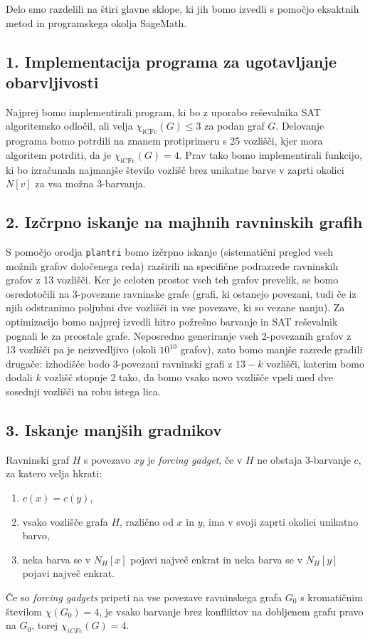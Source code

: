 \documentclass[11pt, a4paper]{article}
\begin{document}
Delo smo razdelili na štiri glavne sklope, ki jih bomo izvedli s pomočjo eksaktnih metod in programskega okolja SageMath.

\subsection*{1. Implementacija programa za ugotavljanje obarvljivosti}

Najprej bomo implementirali program, ki bo z uporabo reševalnika SAT algoritemsko odločil, ali velja $\chi_{\mathrm{iCFc}}(G) \le 3$ za podan graf $G$. Delovanje programa bomo potrdili na znanem protiprimeru s 25 vozlišči, kjer mora algoritem potrditi, da je $\chi_{\mathrm{iCFc}}(G) = 4$. Prav tako bomo implementirali funkcijo, ki bo izračunala najmanjše število vozlišč brez unikatne barve v zaprti okolici $N[v]$ za vsa možna 3-barvanja.

\subsection*{2. Izčrpno iskanje na majhnih ravninskih grafih}

S pomočjo orodja \texttt{plantri} bomo izčrpno iskanje (sistematični pregled vseh možnih grafov določenega reda) razširili na specifične podrazrede ravninskih grafov z 13 vozlišči. Ker je celoten prostor vseh teh grafov prevelik, se bomo osredotočili na 3-povezane ravninske grafe (grafi, ki ostanejo povezani, tudi če iz njih odstranimo poljubni dve vozlišči in vse povezave, ki so vezane nanju). Za optimizacijo bomo najprej izvedli hitro požrešno barvanje in SAT reševalnik pognali le za preostale grafe. Neposredno generiranje vseh 2-povezanih grafov z 13 vozlišči pa je neizvedljivo (okoli $10^{10}$ grafov), zato bomo manjše razrede gradili drugače: izhodišče bodo 3-povezani ravninski grafi z $13 - k$ vozlišči, katerim bomo dodali $k$ vozlišč stopnje 2 tako, da bomo vsako novo vozlišče vpeli med dve sosednji vozlišči na robu istega lica.

\subsection*{3. Iskanje manjših gradnikov}

Ravninski graf $H$ s povezavo $xy$ je \emph{forcing gadget}, če v $H$ ne obstaja 3-barvanje $c$, za katero velja hkrati:
\begin{enumerate}
    \item[(i)] $c(x) = c(y)$,
    \item[(ii)] vsako vozlišče grafa $H$, različno od $x$ in $y$, ima v svoji zaprti okolici unikatno barvo,
    \item[(iii)] neka barva se v $N_H[x]$ pojavi največ enkrat in neka barva se v $N_H[y]$ pojavi največ enkrat.
\end{enumerate}
Če so \emph{forcing gadgets} pripeti na vse povezave ravninskega grafa $G_0$ s kromatičnim številom $\chi(G_0) = 4$, je vsako barvanje brez konfliktov na dobljenem grafu pravo na $G_0$, torej $\chi_{iCFc}(G) = 4$. 
\end{document}
